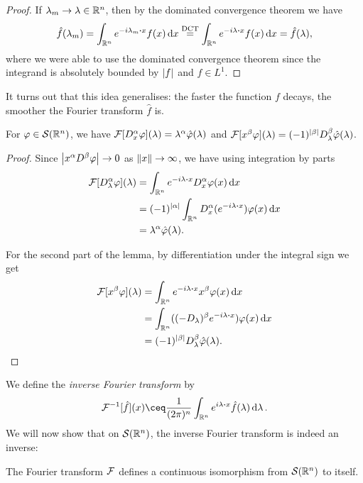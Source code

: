 \begin{proof}
	If $\lambda_m \to \lambda \in \mathbb R^n$, then by the dominated convergence theorem we have
	\[
	\hat f(\lambda_m) = \int_{\RR^n} e^{-i\lambda_m \vdot x} f(x) \dd{x} \overset{\text{DCT}}= \int_{\RR^n} e^{-i\lambda \vdot x} f(x) \dd{x} = \hat f(\lambda),
	\]
	where we were able to use the dominated convergence theorem since the integrand is absolutely bounded by $\abs{f}$ and $f \in L^1$. 
\end{proof}

It turns out that this idea generalises: the faster the function $f$ decays, the smoother the Fourier transform $\hat f$ is.  

\begin{lemma} \label{lem:differentiate_fourier}
	For $\varphi \in \mathcal S(\mathbb R^n)$, we have $\mathcal F[D_x^\alpha \varphi](\lambda) = \lambda^\alpha \hat{\varphi}(\lambda)$ and $\mathcal F[x^\beta\varphi](\lambda) = (-1)^{\abs{\beta}} D_\lambda^\beta \hat{\varphi}(\lambda)$. 
\end{lemma}

\begin{proof}
	Since $\abs{x^\alpha D^\beta\varphi} \to 0$ as $\norm{x} \to \infty$, we have using integration by parts
	\begin{align*}
		\FF[D_\lambda^\alpha\phi](\lambda) &= \int_{\RR^n} e^{-i\lambda \vdot x} D_x^\alpha \phi(x) \dd{x} \\
		&= (-1)^{\abs{\alpha}} \int_{\RR^n} D_x^\alpha(e^{-i\lambda \vdot x}) \phi(x) \dd{x} \\
		&= \lambda^\alpha\hat\phi(\lambda). 
	\end{align*}
	
	For the second part of the lemma, by differentiation under the integral sign we get
	\begin{align*}
		 \FF[x^\beta \phi](\lambda) &=  \int_{\RR^n} e^{-i\lambda \vdot x} x^\beta \phi(x) \dd{x} \\
		 &= \int_{\RR^n} ((-D_\lambda)^\beta e^{-i\lambda \vdot x}) \phi(x) \dd{x} \\
		 &= (-1)^{\abs{\beta}} D_\lambda^\beta \hat\phi(\lambda).
	\end{align*}
\end{proof}


We define the \emph{inverse Fourier transform} by 
\[
\FF^{-1}[\hat f](x)  \ceq \frac{1}{(2\pi)^n} \int_{\RR^n} e^{i\lambda \vdot x} \hat f(\lambda) \dd{\lambda}. 
\]
We will now show that on $\mathcal S(\mathbb R^n)$, the inverse Fourier transform is indeed an inverse:
\begin{theorem} \label{thm:fourier_transform_isomorphism}
	The Fourier transform $\mathcal F$ defines a continuous isomorphism from $\mathcal S(\mathbb R^n)$ to itself. 
\end{theorem}

